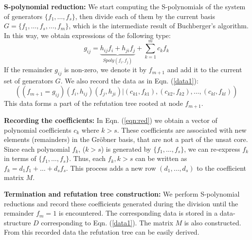 {\bf S-polynomial reduction:} We start computing the S-polynomials of the system of
generators $\{f_1,\ldots,f_s\}$, then divide each of them by the
current basis $G=\{f_1,\dots,f_s,\dots,f_m\}$, which is the
intermediate result of Buchberger's algorithm.  
In this way, we obtain expressions of the following type:
\begin{equation}
\label{eqn:red}
g_{ij}= \underbrace{h_{ij}f_{i}+h_{ji}f_{j}}_{Spoly(f_i,f_j)}+\displaystyle\sum_{k=1}^m c_kf_k
\end{equation}
If the remainder $g_{ij}$ is non-zero, we denote it by
$f_{m+1}$ and add it to the current set of generators $G$. We
also record the data as in Eqn. (\ref{data1}): 
\begin{displaymath}
((f_{m+1}=g_{ij})(f_{i},h_{ij})(f_{j},h_{ji})| (c_{k1},f_{k1}),(c_{k2},f_{k2}),\dots,(c_{kl},f_{kl}))
\end{displaymath}
This data forms a part of the refutation tree rooted at node $f_{m+1}$.

{\bf Recording the coefficients:} In Eqn. (\ref{eqn:red}) we obtain a
vector of polynomial coefficients $c_k$ where $k>s$. These
coefficients are associated with new elements (remainders) in the
Gr\"obner basis, that are not a part of the unsat core. 
Since each polynomial $f_k$, ($k>s$) is generated by
$\{f_1,\dots,f_s\}$, we can re-express $f_k$ in terms of $\{f_1,\dots,
f_s\}$. Thus, each $f_k, k>s$ can be written as $f_k = d_1f_1 + \dots
+ d_sf_s$. This process adds a new row $(d_1,\dots,d_s)$ to the
coefficient matrix $M$. 



{\bf Termination and refutation tree construction:} We perform
S-polynomial reductions and record these coefficients  generated
during the division until the remainder $f_m = 1$ is encountered. The
corresponding data is stored in a data-structure $D$ corresponding to
Eqn. (\ref{data1}). The matrix $M$ is also constructed. From this
recorded data the refutation tree can be easily derived. 

